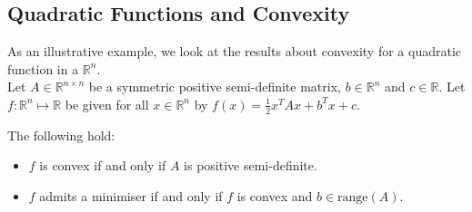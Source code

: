 \documentclass{article}
\begin{document}
\subsection{Quadratic Functions and Convexity}
As an illustrative example, we look at the results about convexity for a quadratic function in a $\mathbb{R}^n$.\\
Let $A \in \mathbb{R}^{n \times n}$ be a symmetric positive semi-definite matrix, $b \in \mathbb{R}^n$ and $c \in \mathbb{R}$. Let $f:\mathbb{R}^n \mapsto \mathbb{R}$ be given for all $x \in \mathbb{R}^n$ by $f(x)=\frac{1}{2}x^TAx+b^Tx+c.$
\begin{thm}

The following hold:
\begin{itemize}
\item[a)] $f$ is convex if and only if $A$ is positive semi-definite.
\item[b)] $f$ admits a minimiser if and only if $f$ is convex and $b \in \text{range}(A)$.
\end{itemize}
\end{thm}
\end{document}
